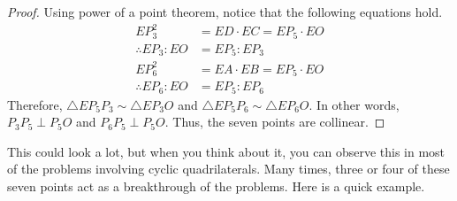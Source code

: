 \documentclass[../../../main.tex]{subfiles}
\begin{document}
\begin{proof}
Using power of a point theorem, notice that the following equations
hold.
\begin{align*}
    EP_3^2 &= ED \cdot EC = EP_5 \cdot EO \\
    \therefore
    EP_3 : EO &= EP_5 : EP_3 \\
    EP_6^2 &= EA \cdot EB = EP_5 \cdot EO \\
    \therefore
    EP_6 : EO &= EP_5 : EP_6
\end{align*}
Therefore, $\triangle{EP_5P_3} \sim \triangle{EP_3O}$ and
$\triangle{EP_5P_6} \sim \triangle{EP_6O}$. In other words,
$P_3P_5 \perp P_5O$ and $P_6P_5 \perp P_5O$. Thus, the seven points
are collinear.
\end{proof}

This could look a lot, but when you think about it, you can observe
this in most of the problems involving cyclic quadrilaterals.
Many times, three or four of these seven points act as a breakthrough
of the problems. Here is a quick example.
\end{document}
